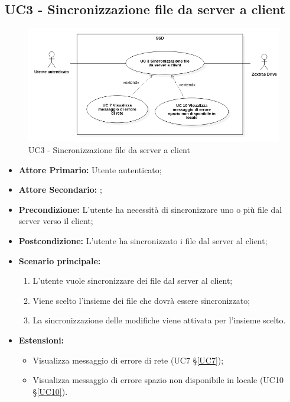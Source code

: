 \subsection{UC3 - Sincronizzazione file da server a client}
\label{UC3}
\begin{figure}[H]
    \centering
    \includegraphics[scale = 0.5]{components/img/UC3.png}
    \caption{UC3 - Sincronizzazione file da server a client}
\end{figure}
\begin{itemize}
\item \textbf{Attore Primario:} Utente autenticato;
\item \textbf{Attore Secondario:} ;
\item \textbf{Precondizione:} L'utente ha necessità di sincronizzare uno o più file dal server verso il client;
\item \textbf{Postcondizione:} L'utente ha sincronizzato i file dal server al client;
\item \textbf{Scenario principale:}
    \begin{enumerate}
    \item L'utente vuole sincronizzare dei file dal server al client;
    \item Viene scelto l'insieme dei file che dovrà essere sincronizzato;
    \item La sincronizzazione delle modifiche viene attivata per l'insieme scelto.
    \end{enumerate}
\item \textbf{Estensioni:}
    \begin{itemize}
    \item Visualizza messaggio di errore di rete (UC7 \S{}\ref{UC7});
    \item Visualizza messaggio di errore spazio non disponibile in locale (UC10 \S{}\ref{UC10}).
\end{itemize}
\end{itemize}
